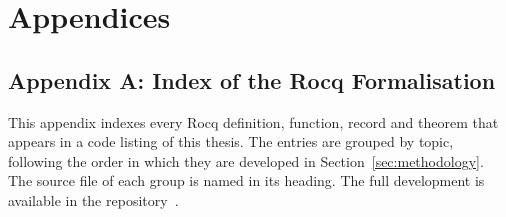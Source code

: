 {}
\section*{Appendices}

\subsection*{Appendix A: Index of the Rocq Formalisation}

This appendix indexes every Rocq definition, function, record and theorem that
appears in a code listing of this thesis. The entries are grouped by topic, following
the order in which they are developed in
Section~\ref{sec:methodology}. The source file of each group is named in its
heading. The full development is available in the
repository~\cite{OurRocqRepo}.

